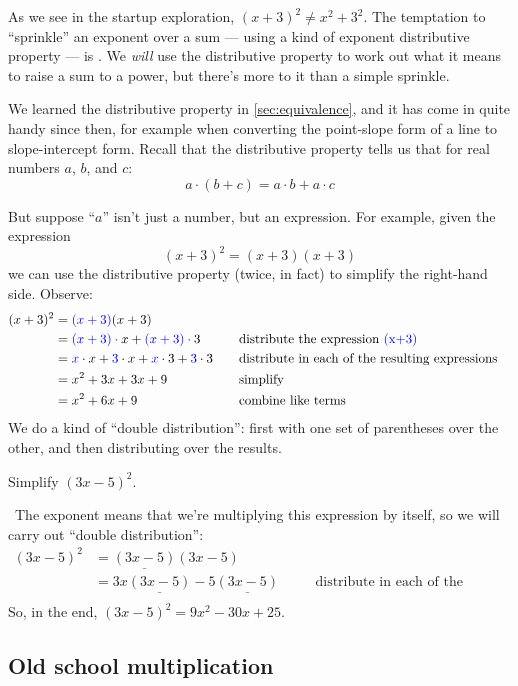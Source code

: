 As we see in the startup exploration, $(x + 3)^2 \neq x^2 + 3^2$. The temptation to ``sprinkle'' an exponent over a sum --- using a kind of exponent distributive property --- is \evilandwrong. We \textit{will} use the distributive property to work out what it means to raise a sum to a power, but there's more to it than a simple sprinkle.

We learned the distributive property in \cref{sec:equivalence}, and it has come in quite handy since then, for example when converting the point-slope form of a line to slope-intercept form. Recall that the distributive property tells us that for real numbers $a$, $b$, and $c$:
\[a \cdot (b+c) = a\cdot b + a\cdot c\]

But suppose ``$a$'' isn't just a number, but an expression. For example, given the expression
\[(x+3)^2 = (x+3)(x+3)\]
we can use the distributive property (twice, in fact) to simplify the right-hand side. Observe:
\[\begin{aligned}
(x+3)^2
&= {\color{blue}(x+3)}{(x+3)}
\\
&= {\color{blue}(x+3)} \cdot x + {\color{blue}(x+3)} \cdot 3
&& \quad\text{distribute the expression {\color{blue}(x+3)}}
\\
&= {\color{blue}x} \cdot x + {\color{blue}3} \cdot x + {\color{blue}x} \cdot 3 + {\color{blue}3} \cdot 3
&& \quad\text{distribute in each of the resulting expressions}
\\
&= x^2 + 3x + 3x + 9
&& \quad\text{simplify}
\\
&= x^2 + 6x + 9
&& \quad\text{combine like terms}
\end{aligned}\]
We do a kind of ``double distribution'': first with one set of parentheses over the other, and then distributing over the results.

\begin{boxedex}
Simplify $(3x-5)^2$.

\exsoln\ The exponent means that we're multiplying this expression by itself, so we will carry out ``double distribution'':
\[\begin{aligned}
(3x-5)^2
&= \underline{(3x-5)}(3x-5)
\\
&= 3x\underline{(3x-5)} - 5\underline{(3x-5)}
&& \quad\text{distribute in each of the resulting expressions}
\\
\end{aligned}\]
So, in the end, $(3x-5)^2 = 9x^2 - 30x + 25$.
\end{boxedex}

\subsection{Old school multiplication}

